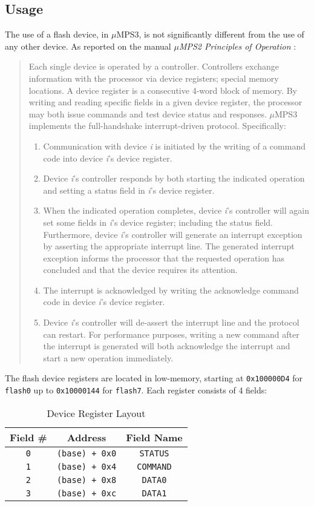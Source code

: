 \documentclass[12pt,a4paper,openright,twoside]{report}
\begin{document}
\subsection{Usage}
	The use of a flash device, in $\mu$MPS3, is not significantly different from the use of any other device. As reported on the manual \textit{$\mu$MPS2 Principles of Operation} \cite{pops}:
	\begin{quote}
	Each single device is operated by a controller.
	Controllers exchange information with the processor via device registers; special memory locations.
	A device register is a consecutive 4-word block of memory.
	By writing and reading specific fields in a given device register, the processor may both issue commands and test device status and responses.
	$\mu$MPS3 implements the full-handshake interrupt-driven protocol.
	Specifically:
	\begin{enumerate}
	\item Communication with device \textit{i} is initiated by the writing of a command code into device \textit{i}'s device register.
	\item Device \textit{i}'s controller responds by both starting the indicated operation and setting a status field in \textit{i}'s device register.
	\item When the indicated operation completes, device \textit{i}'s controller will again set some fields in \textit{i}'s device register; including the status field.
	Furthermore, device \textit{i}'s controller will generate an interrupt exception by asserting the appropriate interrupt line.
	The generated interrupt exception informs the processor that the requested operation has concluded and that the device requires its attention.
	\item The interrupt is acknowledged by writing the acknowledge command code in device \textit{i}'s device register.
	\item Device \textit{i}'s controller will de-assert the interrupt line and the protocol can restart.
	For performance purposes, writing a new command after the interrupt is generated will both acknowledge the interrupt and start a new operation immediately.
	\end{enumerate}
	\end{quote}
	The flash device registers are located in low-memory, starting at \texttt{0x100000D4} for \texttt{flash0} up to \texttt{0x10000144} for \texttt{flash7}.
	Each register consists of 4 fields:
	\begin{table}[h]
	\centering
	\begin{tabular}{c|c|c}
	Field \# & Address & Field Name \\  \hline\hline
	\texttt{0} & \texttt{(base) + 0x0} & \texttt{STATUS} \\ \hline
	\texttt{1} & \texttt{(base) + 0x4} & \texttt{COMMAND} \\ \hline
	\texttt{2} & \texttt{(base) + 0x8} & \texttt{DATA0} \\ \hline
	\texttt{3} & \texttt{(base) + 0xc} & \texttt{DATA1}
	\end{tabular}
	\caption{Device Register Layout}
	\end{table}
\end{document}
